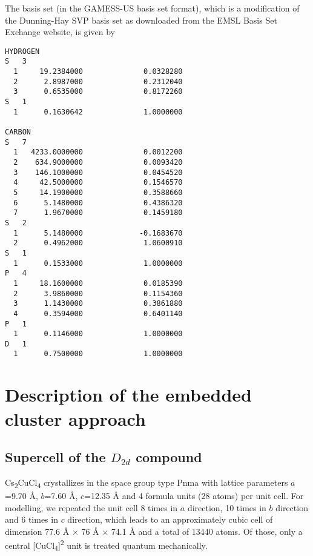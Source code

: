 The basis set (in the GAMESS-US\cite{SchmiBBEGJKMNSWDM_1993_1347} basis set format), which is a modification of the Dunning-Hay SVP basis set\cite{DunniH_1977_1} as downloaded from the EMSL Basis Set Exchange\cite{SchucDESGCLW_2007_1045} website, is given by
\begin{verbatim}
HYDROGEN
S   3
  1     19.2384000              0.0328280
  2      2.8987000              0.2312040
  3      0.6535000              0.8172260
S   1
  1      0.1630642              1.0000000

CARBON
S   7
  1   4233.0000000              0.0012200
  2    634.9000000              0.0093420
  3    146.1000000              0.0454520
  4     42.5000000              0.1546570
  5     14.1900000              0.3588660
  6      5.1480000              0.4386320
  7      1.9670000              0.1459180
S   2
  1      5.1480000             -0.1683670
  2      0.4962000              1.0600910
S   1
  1      0.1533000              1.0000000
P   4
  1     18.1600000              0.0185390
  2      3.9860000              0.1154360
  3      1.1430000              0.3861880
  4      0.3594000              0.6401140
P   1
  1      0.1146000              1.0000000
D   1
  1      0.7500000              1.0000000
\end{verbatim}

\section{Description of the embedded cluster approach}
\label{Sec:appendix_detailsembedding}
\subsection{Supercell of the $D_{2d}$ compound}
Cs\textsubscript{2}CuCl\textsubscript{4} crystallizes in the space group type Pnma with lattice parameters $a$=9.70 Å, $b$=7.60 Å, $c$=12.35 Å and 4 formula units (28 atoms) per unit cell. For modelling, we repeated the unit cell 8 times in $a$ direction, 10 times in $b$ direction and 6 times in $c$ direction, which leads to an approximately cubic cell of dimension 77.6 Å × 76 Å × 74.1 Å and a total of 13440 atoms. Of those, only a central [CuCl\textsubscript{4}]\textsuperscript{2\textminus} unit is treated quantum mechanically.

